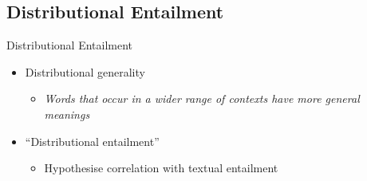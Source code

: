 \documentclass{beamer}
\newlength{\wideitemsep}
\let\olditem\item
\renewcommand{\item}{\setlength{\itemsep}{\wideitemsep}\olditem}
\begin{document}


\subsection{Distributional Entailment}

\begin{frame}{Distributional Entailment}
\begin{itemize}
\item Distributional generality
\begin{itemize}
\item \emph{Words that occur in a wider range of contexts have more
    general meanings}
\end{itemize}
\item ``Distributional entailment''
\begin{itemize}
\item Hypothesise correlation with textual entailment
\end{itemize}
\end{itemize}
\end{frame}
\end{document}
